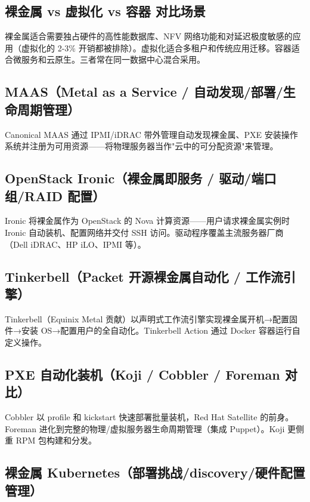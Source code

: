 \documentclass[12pt,UTF8]{ctexbook}
\begin{document}
    \subsection{裸金属 vs 虚拟化 vs 容器 对比场景}

裸金属适合需要独占硬件的高性能数据库、NFV 网络功能和对延迟极度敏感的应用（虚拟化的 2-3\% 开销都被排除）。虚拟化适合多租户和传统应用迁移。容器适合微服务和云原生。三者常在同一数据中心混合采用。

    \subsection{MAAS（Metal as a Service / 自动发现/部署/生命周期管理）}

Canonical MAAS 通过 IPMI/iDRAC 带外管理自动发现裸金属、PXE 安装操作系统并注册为可用资源——将物理服务器当作"云中的可分配资源"来管理。

    \subsection{OpenStack Ironic（裸金属即服务 / 驱动/端口组/RAID 配置）}

Ironic 将裸金属作为 OpenStack 的 Nova 计算资源——用户请求裸金属实例时 Ironic 自动装机、配置网络并交付 SSH 访问。驱动程序覆盖主流服务器厂商（Dell iDRAC、HP iLO、IPMI 等）。

    \subsection{Tinkerbell（Packet 开源裸金属自动化 / 工作流引擎）}

Tinkerbell（Equinix Metal 贡献）以声明式工作流引擎实现裸金属开机→配置固件→安装 OS→配置用户的全自动化。Tinkerbell Action 通过 Docker 容器运行自定义操作。

    \subsection{PXE 自动化装机（Koji / Cobbler / Foreman 对比）}

Cobbler 以 profile 和 kickstart 快速部署批量装机，Red Hat Satellite 的前身。Foreman 进化到完整的物理/虚拟服务器生命周期管理（集成 Puppet）。Koji 更侧重 RPM 包构建和分发。

    \subsection{裸金属 Kubernetes（部署挑战/discovery/硬件配置管理）}
\end{document}
